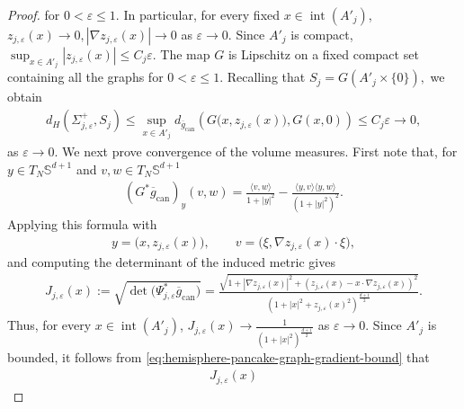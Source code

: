 \documentclass[10pt,a4paper]{amsart}
\def\bS {\mathbb{S}}
\newcommand{\can}{\mathrm{can}}
\newcommand{\la}{\langle}
\newcommand{\ra}{\rangle}
\begin{document}
\begin{proof}
for $0<\varepsilon\leq1$. In particular, for every fixed
$x\in\operatorname{int}(A'_j)$, $z_{j,\varepsilon}(x)
        \rightarrow
        0,
        |\nabla z_{j,\varepsilon}(x)|
        \rightarrow
        0$ as $\varepsilon\to0$. Since $A'_j$ is compact, $\sup_{x\in A'_j}|z_{j,\varepsilon}(x)| \leq C_j\varepsilon.$ The map $G$ is Lipschitz on a fixed compact set containing all the graphs
for $0<\varepsilon\leq1$. Recalling that $ S_j
        =
        G(A'_j\times\{0\}),$ we obtain
\begin{align}\label{eq:hemisphere-pancake-upper-sheet-Hausdorff}
        d_H(\Sigma_{j,\varepsilon}^+,S_j)
        \leq
        \sup_{x\in A'_j}
        d_{\overline g_{\can}}
        \left(
        G\bigl(x,z_{j,\varepsilon}(x)\bigr),
        G(x,0)
        \right)
        \leq
        C_j\varepsilon
        \rightarrow
        0,
\end{align}
as $\varepsilon\to 0.$ We next prove convergence of the volume measures. First note that, for $y\in T_N\bS^{d+1}$ and $v,w\in T_N\bS^{d+1}$
\begin{align}
        (G^*\overline g_{\can})_y(v,w)
        =
        \frac{\la v,w\ra}{1+|y|^2}
        -
        \frac{\la y,v\ra\la y,w\ra}
        {(1+|y|^2)^2}.
\end{align}
Applying this formula with
\begin{align}
        y
        =
        \bigl(x,z_{j,\varepsilon}(x)\bigr),
        \qquad
        v
        =
        \bigl(\xi,\nabla z_{j,\varepsilon}(x)\cdot\xi\bigr),
\end{align}
and computing the determinant of the induced metric gives
\begin{align}\label{eq:hemisphere-pancake-spherical-graph-Jacobian}
        J_{j,\varepsilon}(x)
        :=
        \sqrt{
        \det\bigl(\Psi_{j,\varepsilon}^*
        \overline g_{\can}\bigr)
        }
        =
        \frac{
        \sqrt{
        1+|\nabla z_{j,\varepsilon}(x)|^2
        +
        \left(
        z_{j,\varepsilon}(x)
        -
        x\cdot\nabla z_{j,\varepsilon}(x)
        \right)^2
        }
        }{
        \left(
        1+|x|^2+z_{j,\varepsilon}(x)^2
        \right)^{\frac{d+1}{2}}
        }.
\end{align}
Thus, for every $x\in\operatorname{int}(A'_j)$, $ J_{j,\varepsilon}(x) \to \frac{1}{(1+|x|^2)^{\frac{d+1}{2}}}$ as $\varepsilon \to 0.$ Since $A'_j$ is bounded, it follows from \eqref{eq:hemisphere-pancake-graph-gradient-bound} that
\begin{align}
        J_{j,\varepsilon}(x)

\end{align}
\end{proof}
\end{document}
